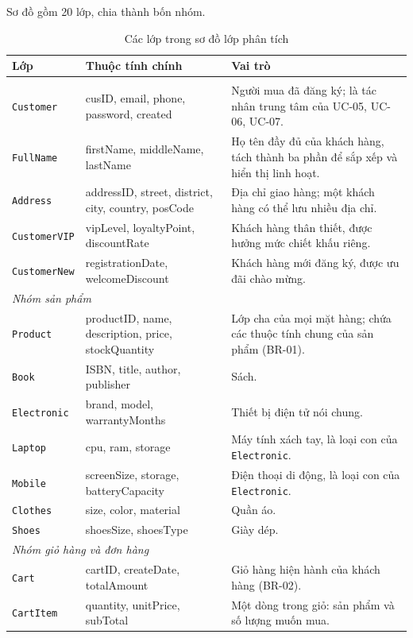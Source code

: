 \documentclass[12pt,a4paper,oneside]{report}
\begin{document}
Sơ đồ gồm 20 lớp, chia thành bốn nhóm.

\begin{longtable}{p{2.9cm}p{4.4cm}p{8.5cm}}
\caption{Các lớp trong sơ đồ lớp phân tích}\\
\toprule
\textbf{Lớp} & \textbf{Thuộc tính chính} & \textbf{Vai trò} \\
\midrule
\endhead
\bottomrule
\endlastfoot
\multicolumn{3}{l}{\textit{Nhóm khách hàng}} \\
\texttt{Customer} & cusID, email, phone, password, created & Người mua đã đăng ký; là tác nhân trung tâm của UC-05, UC-06, UC-07. \\
\texttt{FullName} & firstName, middleName, lastName & Họ tên đầy đủ của khách hàng, tách thành ba phần để sắp xếp và hiển thị linh hoạt. \\
\texttt{Address} & addressID, street, district, city, country, posCode & Địa chỉ giao hàng; một khách hàng có thể lưu nhiều địa chỉ. \\
\texttt{CustomerVIP} & vipLevel, loyaltyPoint, discountRate & Khách hàng thân thiết, được hưởng mức chiết khấu riêng. \\
\texttt{CustomerNew} & registrationDate, welcomeDiscount & Khách hàng mới đăng ký, được ưu đãi chào mừng. \\
\multicolumn{3}{l}{\textit{Nhóm sản phẩm}} \\
\texttt{Product} & productID, name, description, price, stockQuantity & Lớp cha của mọi mặt hàng; chứa các thuộc tính chung của sản phẩm (BR-01). \\
\texttt{Book} & ISBN, title, author, publisher & Sách. \\
\texttt{Electronic} & brand, model, warrantyMonths & Thiết bị điện tử nói chung. \\
\texttt{Laptop} & cpu, ram, storage & Máy tính xách tay, là loại con của \texttt{Electronic}. \\
\texttt{Mobile} & screenSize, storage, batteryCapacity & Điện thoại di động, là loại con của \texttt{Electronic}. \\
\texttt{Clothes} & size, color, material & Quần áo. \\
\texttt{Shoes} & shoesSize, shoesType & Giày dép. \\
\multicolumn{3}{l}{\textit{Nhóm giỏ hàng và đơn hàng}} \\
\texttt{Cart} & cartID, createDate, totalAmount & Giỏ hàng hiện hành của khách hàng (BR-02). \\
\texttt{CartItem} & quantity, unitPrice, subTotal & Một dòng trong giỏ: sản phẩm và số lượng muốn mua. \\

\end{longtable}
\end{document}
